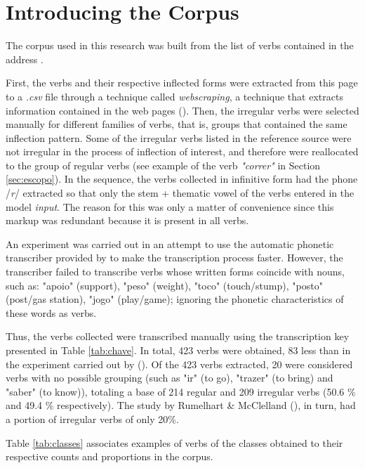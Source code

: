 \section{Introducing the Corpus}
\label{sec:corpus}
The corpus used in this research was built from the list of verbs contained in the address .

First, the verbs and their respective inflected forms were extracted from this page to a \textit{.csv} file through a technique called \textit {webscraping}, a technique that extracts information contained in the web pages (\cite{mitchell:2015}). Then, the irregular verbs were selected manually for different families of verbs, that is, groups that contained the same inflection pattern. Some of the irregular verbs listed in the reference source were not irregular in the process of inflection of interest, and therefore were reallocated to the group of regular verbs (see example of the verb \textit{"correr"} in Section \ref{sec:escopo}). In the sequence, the verbs collected in infinitive form had the phone /\textit{r}/ extracted so that  only the stem + thematic vowel of the verbs entered in the model \textit{input}. The reason for this was only a matter of convenience since this markup was redundant because it is present in all verbs.


 An experiment was carried out in an attempt to use the automatic phonetic transcriber provided by \cite{guide:2016} to make the transcription process faster. However, the transcriber failed to transcribe verbs whose written forms coincide with nouns, such as: "apoio" (support), "peso" (weight), "toco" (touch/stump), "posto" (post/gas station), "jogo" (play/game); ignoring the phonetic characteristics of these words as verbs.
 
 Thus, the verbs collected were transcribed manually using the transcription key presented in Table \ref{tab:chave}. In total, 423 verbs were obtained, 83 less than in the experiment carried out by (\cite{rumelhart:1986}). Of the 423 verbs extracted, 20 were considered verbs with no possible grouping (such as "ir" (to go), "trazer" (to bring) and "saber" (to know)), totaling a base of 214 regular and 209 irregular verbs (50.6 \% and 49.4 \% respectively). The study by Rumelhart \& McClelland (\citeyear{rumelhart:1986}), in turn, had a portion of irregular verbs of only 20\%.

Table \ref{tab:classes} associates examples of verbs of the classes obtained to their respective counts and proportions in the corpus.


